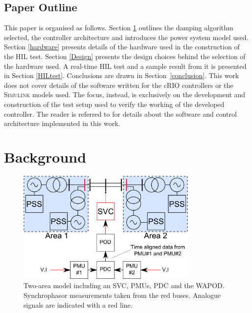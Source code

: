 \documentclass[conference]{IEEEtran}
\begin{document}
\subsection{Paper Outline}
This paper is organised as follows. Section \ref{background} outlines the damping algorithm selected, the controller architecture and introduces the power system model used. Section \ref{hardware} presents details of the hardware used in the construction of the HIL test. Section \ref{Design} presents the design choices behind the selection of the hardware used. A real-time HIL test and a sample result from it is presented in Section \ref{HILtest}. Conclusions are drawn in Section~\ref{conclusion}. This work does not cover details of the software written for the cRIO controllers or the \textsc{Simulink} models used. The focus, instead, is exclusively on the development and construction of the test setup used to verify the working of the developed controller. The reader is referred to \cite{Rebello} for details about the software and control architecture implemented in this work.

\section{Background}\label{background}

\begin{figure}[!h]
\centering
\includegraphics[width=3.5in]{TwoArea.pdf} 
\caption{Two-area model including an SVC, PMUs, PDC and the WAPOD. Synchrophasor measurements taken from the red buses. Analogue signals are indicated with a red line.}
\label{TwoArea}
\end{figure}
\end{document}

